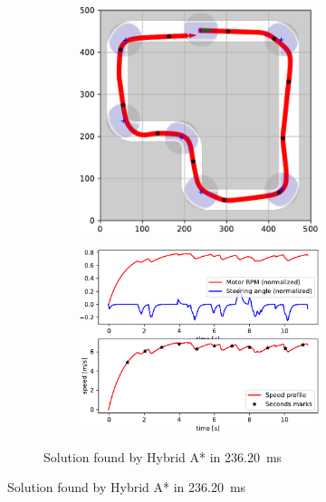 \begin{figure}[!tbp]%
	\centering

	\begin{subfigure}[t]{\textwidth}
		\begin{subfigure}[t]{0.45\textwidth}
			\includegraphics[width=\textwidth]{../img/experiments/simple-hybrid_astar-trajectory}
		\end{subfigure}
		\hfill
		\begin{subfigure}[t]{0.45\textwidth}
			\includegraphics[width=\textwidth]{../img/experiments/simple-hybrid_astar-actuators}
		\end{subfigure}
		\caption{Solution found by Hybrid A* in \SI{236.20}{\milli\second}}
		\label{fig:simple-hybrid_astar}
	\end{subfigure}


\end{figure}
